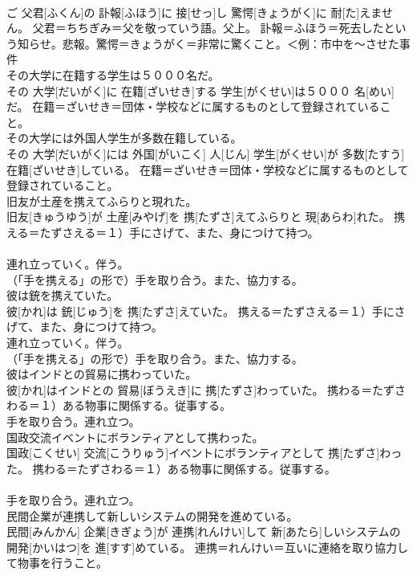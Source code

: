 \documentclass[8pt]{extreport}
\begin{document}
\begin{CJK}{UTF8}{min}
{\\	ご 父君[ふくん]の 訃報[ふほう]に 接[せっ]し 驚愕[きょうがく]に 耐[た]えません。	父君＝ちちぎみ＝父を敬っていう語。父上。 訃報＝ふほう＝死去したという知らせ。悲報。驚愕＝きょうがく＝非常に驚くこと。＜例：市中を〜させた事件
\\	その大学に在籍する学生は５０００名だ。	
\\	その 大学[だいがく]に 在籍[ざいせき]する 学生[がくせい]は５０００ 名[めい]だ。	在籍＝ざいせき＝団体・学校などに属するものとして登録されていること。
\\	その大学には外国人学生が多数在籍している。	
\\	その 大学[だいがく]には 外国[がいこく] 人[じん] 学生[がくせい]が 多数[たすう] 在籍[ざいせき]している。	在籍＝ざいせき＝団体・学校などに属するものとして登録されていること。
\\	旧友が土産を携えてふらりと現れた。	
\\	旧友[きゅうゆう]が 土産[みやげ]を 携[たずさ]えてふらりと 現[あらわ]れた。	携える＝たずさえる＝１）手にさげて、また、身につけて持つ。 　　　　　　　　　　
\\	連れ立っていく。伴う。 　　　　　　　　　　
\\	（「手を携える」の形で）手を取り合う。また、協力する。
\\	彼は銃を携えていた。	
\\	彼[かれ]は 銃[じゅう]を 携[たずさ]えていた。	携える＝たずさえる＝１）手にさげて、また、身につけて持つ。 　　　　　　　　　　
\\	連れ立っていく。伴う。 　　　　　　　　　　
\\	（「手を携える」の形で）手を取り合う。また、協力する。
\\	彼はインドとの貿易に携わっていた。	
\\	彼[かれ]はインドとの 貿易[ぼうえき]に 携[たずさ]わっていた。	携わる＝たずさわる＝１）ある物事に関係する。従事する。 　　　　　　　　　　
\\	手を取り合う。連れ立つ。
\\	国政交流イベントにボランティアとして携わった。	
\\	国政[こくせい] 交流[こうりゅう]イベントにボランティアとして 携[たずさ]わった。	携わる＝たずさわる＝１）ある物事に関係する。従事する。 　　　　　　　　　　
\\	手を取り合う。連れ立つ。
\\	民間企業が連携して新しいシステムの開発を進めている。	
\\	民間[みんかん] 企業[きぎょう]が 連携[れんけい]して 新[あたら]しいシステムの 開発[かいはつ]を 進[すす]めている。	連携＝れんけい＝互いに連絡を取り協力して物事を行うこと。
}
\end{CJK}
\end{document}
